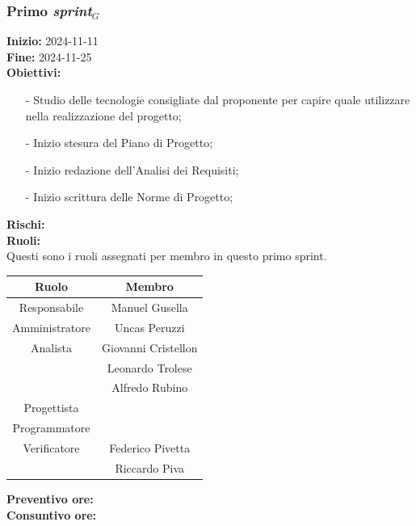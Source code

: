 \documentclass[12pt]{article}
\begin{document}
\subsubsection{Primo \textit{sprint}$_G$}
\textbf{Inizio:} 2024-11-11\\ 
\textbf{Fine:} 2024-11-25\\ 
\textbf{Obiettivi:}
\begin{itemize}
\item [-] Studio delle tecnologie consigliate dal proponente per capire quale utilizzare nella realizzazione del progetto;
\item [-] Inizio stesura del Piano di Progetto;
\item [-] Inizio redazione dell'Analisi dei Requisiti;
\item [-] Inizio scrittura delle Norme di Progetto;
\end{itemize}
\textbf{Rischi:}\\
\textbf{Ruoli:}\\
Questi sono i ruoli assegnati per membro in questo primo sprint.\\
\vspace{2mm}
\begin{center}
\begin{tabular}{|c|c|}
\hline
\textbf{Ruolo} & \textbf{Membro}\\
\hline
Responsabile & Manuel Gusella\\
\hline
Amministratore & Uncas Peruzzi\\ 
\hline
Analista & Giovanni Cristellon\\
& Leonardo Trolese\\
& Alfredo Rubino\\
\hline
Progettista & \\
\hline
Programmatore & \\
\hline
Verificatore & Federico Pivetta\\
& Riccardo Piva\\
\hline
\end{tabular}
\end{center}
\textbf{Preventivo ore:}\\
\textbf{Consuntivo ore:}
\end{document}
